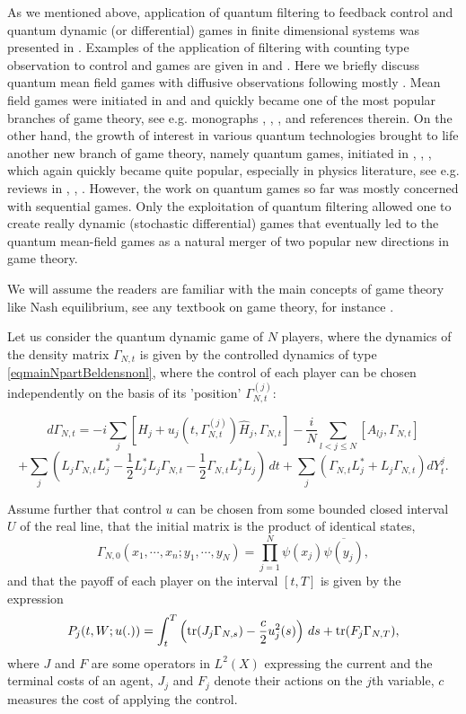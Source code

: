 \documentclass[12pt]{article}
\def\tr{\rm{tr}}
\newcommand{\Ga}{\Gamma}
\begin{document}
As we mentioned above, application of quantum filtering to feedback control and quantum dynamic
(or differential) games in finite dimensional systems was presented in \cite{KolDynQuGames}.
Examples of the application of filtering with counting type observation to control and games are given in
  \cite{Kol92} and \cite{KolQuantMFGCount}.
Here we briefly discuss quantum mean field games with diffusive observations following mostly \cite{KolQuantMFG}.
Mean field games were initiated in \cite{Huang} and \cite{LL2006} and quickly became one of
the most popular branches of game theory, see e.g. monographs
\cite{CarDelbook18}, \cite{BenFr}, \cite{Gomesbook}, \cite{KolMalbook19} and references therein.
On the other hand, the growth of interest in various quantum technologies brought to life
another new branch of game theory, namely quantum games, initiated in \cite{EWL99}, \cite{MW00}, \cite{MeyerD99},
which again quickly became quite popular, especially in physics literature,
see e.g. reviews in \cite{GuoZhang08}, \cite{KhanReview18}, \cite{KolMal}. However,
the work on quantum games so far was mostly concerned with sequential games.
Only the exploitation of quantum filtering allowed one to create really dynamic
(stochastic differential) games that eventually led to the quantum mean-field games
as a natural merger of two popular new directions in game theory.

We will assume the readers are familiar with the main concepts of game theory like Nash equilibrium,
see any textbook on game theory, for instance \cite{KolMal}.

Let us consider the quantum dynamic game of $N$ players, where the dynamics
of the density matrix $\Ga_{N,t}$ is given by the controlled dynamics of type
\eqref{eqmainNpartBeldensnonl}, where
the control of each player can be chosen independently on the basis of its 'position' $\Ga^{(j)}_{N,t}$:

 \[
d \Ga_{N,t}
=-i\sum_j [H_j+u_j(t,\Ga^{(j)}_{N,t}) \hat H_j, \Ga_{N,t}] -\frac{i}{N} \sum_{l<j\le N} [A_{lj},\Ga_{N,t}]
\]
\begin{equation}
\label{eqmainNpartBeldenscoindiv}
+\sum_j (L_j\Ga_{N,t} L_j^* -\frac12 L^*_jL_j \Ga_{N,t} -\frac12 \Ga_{N,t} L^*_jL_j)\, dt
+\sum_j (\Ga_{N,t} L^*_j+L_j \Ga_{N,t}) dY^j_t.
\end{equation}

Assume further that control $u$ can be chosen from some bounded closed interval $U$ of the real line,
 that the initial matrix is the product of identical states,
\[
\Ga_{N,0}(x_1, \cdots, x_n; y_1, \cdots, y_N)=\prod_{j=1}^N \psi(x_j)\overline{\psi(y_j)},
\]
and that the payoff of each player on the interval $[t,T]$ is given by the expression
 \begin{equation}
\label{eqcostfunin}
P_j(t, W ; u(.)) =\int_t^T   \left( {\tr} (J_j \Ga_{N,s}) -\frac{c}{2} u_j^2(s)\right)\, ds +{\tr} (F_j\Ga_{N,T}),
\end{equation}
where $J$ and $F$ are some operators in $L^2(X)$ expressing the current and
the terminal costs of an agent, $J_j$ and $F_j$ denote their actions
on the $j$th variable, $c$ measures the cost of applying the control.
\end{document}
